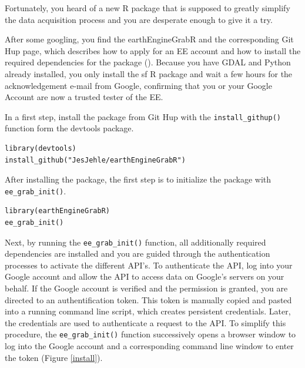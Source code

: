 Fortunately, you heard of a new R package that is supposed to greatly simplify the data acquisition process and you are desperate enough to give it a try. 

After some googling, you find the earthEngineGrabR and the corresponding Git Hup page, which describes how to apply for an EE account and how to install the required dependencies for the package (\cite{earthEngineGrabR}). Because you have GDAL and Python already installed, you only install the sf R package and wait a few hours for the acknowledgement e-mail from Google, confirming that you or your Google Account are now a trusted tester of the EE.

In a first step, install the package from Git Hup with the \texttt{install\_githup()} function form the devtools package.

\begin{lstlisting}
library(devtools)
install_github("JesJehle/earthEngineGrabR")
\end{lstlisting}

After installing the package, the first step is to initialize the package with \texttt{ee\_grab\_init()}. 

\begin{lstlisting}
library(earthEngineGrabR)
ee_grab_init()
\end{lstlisting}

Next, by running the \texttt{ee\_grab\_init()} function, all additionally required dependencies are installed and you are guided through the authentication processes to activate the different API's. To authenticate the API, log into your Google account and allow the API to access data on Google's servers on your behalf. 
If the Google account is verified and the permission is granted, you are directed to an authentification token. This token is manually copied and pasted into a running command line script, which creates persistent credentials. Later, the credentials are used to authenticate a request to the API. To simplify this procedure, the \texttt{ee\_grab\_init()} function successively opens a browser window to log into the Google account and a corresponding command line window to enter the token (Figure \ref{install}). 

